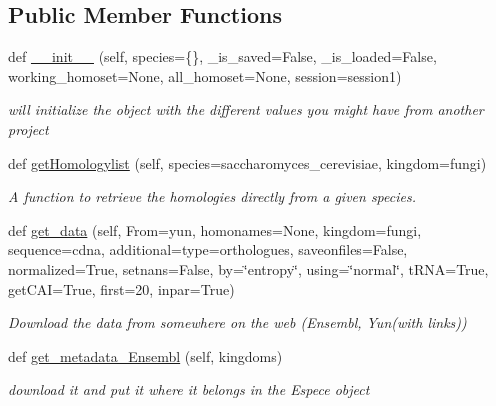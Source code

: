 \subsection*{Public Member Functions}
\begin{DoxyCompactItemize}
\item 
def \mbox{\hyperlink{class_py_c_u_b_1_1py_c_u_b_1_1_py_c_u_b_a0a8de5f32a03de2c681c0582d9998f03}{\+\_\+\+\_\+init\+\_\+\+\_\+}} (self, species=\{\}, \+\_\+is\+\_\+saved=False, \+\_\+is\+\_\+loaded=False, working\+\_\+homoset=None, all\+\_\+homoset=None, session=\textquotesingle{}session1\textquotesingle{})
\begin{DoxyCompactList}\small\item\em will initialize the object with the different values you might have from another project \end{DoxyCompactList}\item 
def \mbox{\hyperlink{class_py_c_u_b_1_1py_c_u_b_1_1_py_c_u_b_ae06a2843c0718f86396ee255dfc6ae6f}{get\+Homologylist}} (self, species=\textquotesingle{}saccharomyces\+\_\+cerevisiae\textquotesingle{}, kingdom=\textquotesingle{}fungi\textquotesingle{})
\begin{DoxyCompactList}\small\item\em A function to retrieve the homologies directly from a given species. \end{DoxyCompactList}\item 
def \mbox{\hyperlink{class_py_c_u_b_1_1py_c_u_b_1_1_py_c_u_b_ac4d231f47432a18f84da1cef8673b50b}{get\+\_\+data}} (self, From=\textquotesingle{}yun\textquotesingle{}, homonames=None, kingdom=\textquotesingle{}fungi\textquotesingle{}, sequence=\textquotesingle{}cdna\textquotesingle{}, additional=\textquotesingle{}type=orthologues\textquotesingle{}, saveonfiles=False, normalized=True, setnans=False, by=\char`\"{}entropy\char`\"{}, using=\char`\"{}normal\char`\"{}, t\+R\+NA=True, get\+C\+AI=True, first=20, inpar=True)
\begin{DoxyCompactList}\small\item\em Download the data from somewhere on the web (Ensembl, Yun(with links)) \end{DoxyCompactList}\item 
def \mbox{\hyperlink{class_py_c_u_b_1_1py_c_u_b_1_1_py_c_u_b_ae561ba39b9c3919a83b51944f155e4a4}{get\+\_\+metadata\+\_\+\+Ensembl}} (self, kingdoms)
\begin{DoxyCompactList}\small\item\em download it and put it where it belongs in the Espece object \end{DoxyCompactList}\item 

\end{DoxyCompactItemize}
